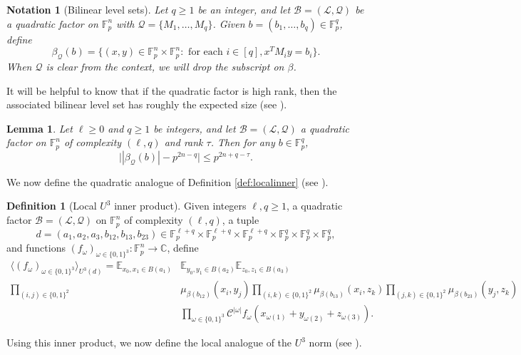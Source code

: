 \documentclass[12pt,oneside,british,a4wide]{amsart}
\newtheorem{lemma}[theorem]{Lemma}
\newtheorem{notation}[theorem]{Notation}
\numberwithin{equation}{section}
\theoremstyle{definition}
\newtheorem{definition}[theorem]{Definition}
\def\E{\mathbb{E}}
\def\C{\mathbb{C}}
\def\F{\mathbb{F}}
\def\ra{\rightarrow}
\newcommand{\calL}{\mathcal{L}}
\newcommand{\calC}{\mathcal{C}}
\newcommand{\calB}{\mathcal{B}}
\newcommand{\calQ}{\mathcal{Q}}
\begin{document}
\begin{notation}[Bilinear level sets]\label{not:beta}
Let $q\geq 1$ be an integer, and let $\calB=(\calL,\calQ)$ be a quadratic factor on $\F_p^n$ with $\calQ=\{M_1,\ldots, M_q\}$. Given $b=(b_1,\ldots, b_q)\in \F_p^q$, define 
$$
\beta_{\calQ}(b)=\{(x,y)\in \F_p^n\times \F_p^n: \text{ for each }i\in[q], x^TM_iy=b_i\}.
$$
When $\calQ$ is clear from the context, we will drop the subscript on $\beta$.
\end{notation}

It will be helpful to know that if the quadratic factor is high rank, then the associated bilinear level set has roughly the expected size (see \cite[Corollary 2.24]{Terry.2021d}). 

\begin{lemma}\label{lem:sizeofbeta}
Let $\ell \geq 0$ and $q\geq 1$ be integers, and let $\calB=(\calL,\calQ)$ a quadratic factor on $\F_p^n$ of complexity $(\ell,q)$ and rank $\tau$. Then for any $b\in \F_p^q$,
$$
\big| |\beta_{\calQ}(b)|-p^{2n-q}\big|\leq p^{2n+q-\tau}.
$$
\end{lemma}

We now define the quadratic analogue of  Definition \ref{def:localinner} (see \cite[Definition 3.11]{Terry.2021d}).

\begin{definition}[Local $U^3$ inner product]\label{def:localu3}
Given integers $\ell,q\geq 1$, a quadratic factor $\calB=(\calL,\calQ)$ on $\F_p^n$ of complexity $(\ell,q)$, a tuple 
$$
d=(a_1,a_2,a_3,b_{12},b_{13},b_{23})\in \F_p^{\ell+q}\times \F_p^{\ell+q}\times \F_p^{\ell+q}\times \F_p^q\times \F_p^q\times \F_p^q,
$$
 and functions $(f_{\omega})_{\omega\in \{0,1\}^3}:\F_p^n\ra \C$, define
\begin{align*}\langle (f_{\omega})_{\omega\in \{0,1\}^3}\rangle_{U^3(d)}=\E_{ x_0,x_1\in B(a_1)}&\E_{y_0,y_1\in B(a_2)}\E_{z_0,z_1\in B(a_3)}\\
\prod_{(i,j)\in \{0,1\}^2} &\mu_{\beta(b_{12})}(x_i,y_j)\prod_{(i,k)\in \{0,1\}^2} \mu_{\beta(b_{13})}(x_i,z_k)\prod_{(j,k)\in \{0,1\}^2} \mu_{\beta(b_{23})}(y_j,z_k)\\
&\prod_{\omega\in \{0,1\}^3}\calC^{|\omega|}f_{\omega}(x_{\omega(1)}+y_{\omega(2)}+z_{\omega(3)}).
\end{align*}
\end{definition}

Using this inner product, we now define the local analogue of the $U^3$ norm (see \cite[Definition 3.13]{Terry.2021d}).
\end{document}
